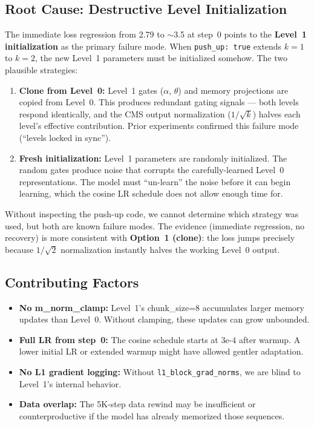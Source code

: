 \documentclass[11pt,a4paper]{article}
\begin{document}
\subsection{Root Cause: Destructive Level Initialization}

The immediate loss regression from 2.79 to $\sim$3.5 at step~0 points to the \textbf{Level~1
initialization} as the primary failure mode. When \texttt{push\_up: true} extends $k{=}1$ to
$k{=}2$, the new Level~1 parameters must be initialized somehow. The two plausible strategies:

\begin{enumerate}[topsep=4pt, itemsep=2pt]
    \item \textbf{Clone from Level~0:} Level~1 gates ($\alpha$, $\theta$) and memory projections
    are copied from Level~0. This produces redundant gating signals --- both levels respond
    identically, and the CMS output normalization ($1/\sqrt{k}$) halves each level's effective
    contribution. Prior experiments confirmed this failure mode (``levels locked in sync'').

    \item \textbf{Fresh initialization:} Level~1 parameters are randomly initialized. The random
    gates produce noise that corrupts the carefully-learned Level~0 representations. The model
    must ``un-learn'' the noise before it can begin learning, which the cosine LR schedule does
    not allow enough time for.
\end{enumerate}

\noindent Without inspecting the push-up code, we cannot determine which strategy was used, but
both are known failure modes. The evidence (immediate regression, no recovery) is more consistent
with \textbf{Option~1 (clone)}: the loss jumps precisely because $1/\sqrt{2}$ normalization
instantly halves the working Level~0 output.

\subsection{Contributing Factors}

\begin{itemize}[topsep=4pt, itemsep=2pt]
    \item \textbf{No m\_norm\_clamp:} Level~1's chunk\_size=8 accumulates larger memory updates
    than Level~0. Without clamping, these updates can grow unbounded.
    \item \textbf{Full LR from step~0:} The cosine schedule starts at $3\text{e-}4$ after warmup.
    A lower initial LR or extended warmup might have allowed gentler adaptation.
    \item \textbf{No L1 gradient logging:} Without \texttt{l1\_block\_grad\_norms}, we are blind
    to Level~1's internal behavior.
    \item \textbf{Data overlap:} The 5K-step data rewind may be insufficient or counterproductive
    if the model has already memorized those sequences.
\end{itemize}
\end{document}
